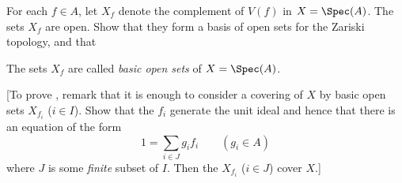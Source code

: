 \begin{exercise}
For each \(f \in A\), let \(X_f\) denote the complement of \(V(f)\) in \(X = \Spec(A)\).
The sets \(X_f\) are open.
Show that they form a basis of open sets for the Zariski topology, and that
The sets \(X_f\) are called \emph{basic open sets} of \(X = \Spec(A)\).

[To prove , remark that it is enough to consider a covering of \(X\) by basic open sets \(X_{f_i}\) (\(i \in I\)).
Show that the \(f_i\) generate the unit ideal and hence that there is an equation of the form
\begin{equation*}
1 = \sum_{i \in J} g_i f_i
\qquad (g_i \in A)
\end{equation*}
where \(J\) is some \emph{finite} subset of \(I\).
Then the \(X_{f_i}\) (\(i \in J\)) cover \(X\).]
\end{exercise}

